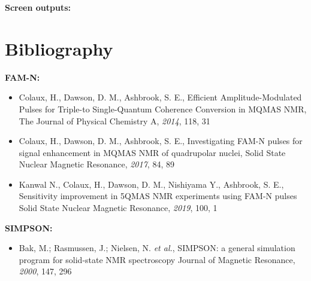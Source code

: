 \documentclass[10pt,a4paper]{article}
\newcommand*{\pythoncode}{\lstinline[{language=Python,%
						basicstyle=\ttfamily,
						}]}
\begin{document}
\hrulefill

\textbf{Screen outputs:}


\section{Bibliography}

\textbf{FAM-N:}
\begin{itemize}
\item Colaux, H., Dawson, D. M., Ashbrook, S. E.,
Efficient Amplitude-Modulated Pulses for Triple-to Single-Quantum Coherence Conversion in MQMAS NMR,
The Journal of Physical Chemistry A, \textit{2014}, 118, 31
\item Colaux, H., Dawson, D. M., Ashbrook, S. E.,
Investigating FAM-N pulses for signal enhancement in MQMAS NMR of quadrupolar nuclei,
Solid State Nuclear Magnetic Resonance, \textit{2017}, 84, 89
\item Kanwal N., Colaux, H., Dawson, D. M., Nishiyama Y., Ashbrook, S. E.,
Sensitivity improvement in 5QMAS NMR experiments using FAM-N pulses
Solid State Nuclear Magnetic Resonance, \textit{2019}, 100, 1
\end{itemize}

\textbf{SIMPSON:}
\begin{itemize}
\item Bak, M.; Rasmussen, J.; Nielsen, N. \textit{et al.},
SIMPSON: a general simulation program for solid-state NMR spectroscopy
Journal of Magnetic Resonance, \textit{2000}, 147, 296
\end{itemize}
\end{document}
